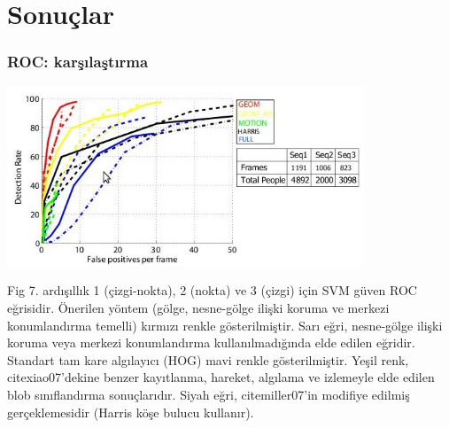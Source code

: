 \documentclass{beamer}
\begin{document}
\section{Sonuçlar}

\begin{frame}
	\frametitle{ROC: karşılaştırma}

	\includegraphics[width=0.8\textwidth]{img/fig7.jpg}\label{fig:ROC}

	\begin{scriptsize}
		Fig 7. ardışıllık 1 (çizgi-nokta), 2 (nokta) ve 3 (çizgi) için SVM güven ROC
		eğrisidir. Önerilen yöntem (gölge, nesne-gölge ilişki koruma ve merkezi
		konumlandırma temelli) kırmızı renkle gösterilmiştir. Sarı eğri, nesne-gölge
		ilişki koruma veya merkezi konumlandırma kullanılmadığında elde edilen
		eğridir. Standart tam kare algılayıcı (HOG) mavi renkle gösterilmiştir.
		Yeşil renk, cite{xiao07}'dekine benzer kayıtlanma, hareket, algılama ve
		izlemeyle elde edilen blob sınıflandırma sonuçlarıdır. Siyah eğri,
		cite{miller07}'in modifiye edilmiş gerçeklemesidir (Harris köşe bulucu
		kullanır).
	\end{scriptsize}
\end{frame}
\end{document}

